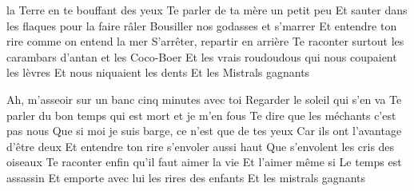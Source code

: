  la Terre en te bouffant des yeux
Te parler de ta mère un petit peu
Et sauter dans les flaques pour la faire râler
Bousiller nos godasses et s'marrer
Et entendre ton rire comme on entend la mer
S'arrêter, repartir en arrière
Te raconter surtout les carambars d'antan et les Coco-Boer
Et les vrais roudoudous qui nous coupaient les lèvres
Et nous niquaient les dents
Et les Mistrals gagnants
\endverse

\beginverse
Ah, m'asseoir sur un banc cinq minutes avec toi
Regarder le soleil qui s'en va
Te parler du bon temps qui est mort et je m'en fous
Te dire que les méchants c'est pas nous
Que si moi je suis barge, ce n'est que de tes yeux
Car ils ont l'avantage d'être deux
Et entendre ton rire s'envoler aussi haut
Que s'envolent les cris des oiseaux
Te raconter enfin qu'il faut aimer la vie
Et l'aimer même si
Le temps est assassin
Et emporte avec lui les rires des enfants
Et les mistrals gagnants
\]\]\]\]\]\]\]\]\]\]\]\]\]\]\]\]\]\]\]\]\]\]\]\]\]\]\]\]\]\]\]\]\]\]\]\]\]\]\]\]\]\]\]\]\]\]\]\]\]\]\]\]\]\]\]\]\]\]\]\]\]\]\]\]\]\]\]\]\]\]\]\]\]\]\]\]\]\]\]\]\]\]\]\]\]\]\]\]\]\]\]\]\]\]\]\]\]\]\]\]\]\]\]\]\]\]\]\]\]\]\]\]\]\]\]\]\]\]\]\]\]\]\]\]\]\]\]\]\]\]\]\]\]\]\]\]\]\]\]\]\]\]\]\]\]\]\]\]\]\]\]\]\]\]\]\]\]\]\]\]\]\]\]\]\]\]\]\]\]\]\]\]\]\]\]\]\]\]\]\]\]\]\]\]\]\]\]\]\]\]\]\]\]\]\]\]\]\]\]\]\]\]\]\]\]\]\]\]\]\]\]\]\]\]\]\]\]\]\]\]\]\]\]\]\]\]\]\]\]\]\]\]\]\]\]\]\]\]\]\]\]\]\]\]\]\]\]\]\]\]\]\]\]\]\]\]\]\]\]\]\]\]\]\]\]\]\]\]\]\]\]\]\]\]\]\]\]\]\]\]\]\]\]\]\]\]\]\]\]\]\]\]\]\]\]\]\]\]\]\]\]\]\]\]\]\]\]\]\]\]\]\]\]\]\]\]\]\]\]\]\]\]\]\]\]\]\]\]\]\]\]\]\]\]\]\]\]\]\]\]\]\]\]\]\]\]\]\]\]\]\]\]\]\]\]\]\]\]\]\]\]\]\]\]\]\]\]\]\]\]\]\]\]\]\]\]\]\]\]\]\]\]\]\]\]\]\]\]\]\]\]\]\]\]\]\]\]\]\]\]\]\]\]\]\]\]\]\]\]\]\]\]\]\]\]\]\]\]\]\]\]\]\]\]\]\]\]\]\]\]\]\]\]\]\]\]\]\]\]\]\]\]\]\]\]\]\]\]\]\]\]\]\]\]\]\]\]\]\]\]\]\]\]\]\]\]\]\]\]\]\]\]\]\]\]\]\]\]\]\]\]\]\]\]\]\]\]\]\]\]\]\]\]\]\]\]\]\]\]\]\]\]\]\]\]\]\]\]\]\]\]\]\]\]\]\]\]\]\]\]\]\]\]\]\]\]\]\]\]\]\]\]\]\]\]\]\]\]\]\]\]\]\]\]\]\]\]\]\]\]\]\]\]\]\]\]\]\]\]\]\]\]\]\]\]\]\]\]\]\]\]\]\]\]\]\]\]\]\]\]\]\]\]\]\]\]\]\]\]\]\]\]\]\]\]\]\]\]\]\]\]\]\]\]\]\]\]\]\]\]\]\]\]\]\]\]\]\]\]\]\]\]\]\]\]\]\]\]\]\]\]\]\]\]\]\]\]\]\]\]\]\]\]\]\]\]\]\]\]\]\]\]\]\]\]\]\]\]\]\]\]\]\]\]\]\]\]\]\]\]\]\]\]\]\]\]\]\]\]\]\]\]\]\]\]\]\]\]\]\]\]\]\]\]\]\]\]\]\]\]\]\]\]\]\]\]\]\]\]\]\]\]\]\]\]\]\]\]\]\]\]\]\]\]\]\]\]\]\]\]\]\]\]\]\]\]\]\]\]\]\]\]\]\]\]\]\]\]\]\]\]\]\]\]\]\]\]\]\]\]\]\]\]\]\]\]\]\]\]\]\]\]\]\]\]\]\]\]\]\]\]\]\]\]\]\]\]\]\]\]\]\]\]\]\]\]\]\]\]\]\]\]\]\]\]\]\]\]\]\]\]\]\]\]\]\]\]\]\]\]\]\]\]\]\]\]\]\]\]\]\]\]\]\]\]\]\]\]\]\]\]\]\]\]\]\]\]\]\]\]\]\]\]\]\]\]\]\]\]\]\]\]\]\]\]\]\]\]\]\]\]\]\]\]\]\]\]\]\]\]\]\]\]\]\]\]\]\]\]\]\]\]\]\]\]\]\]\]\]\]\]\]\]\]\]\]\]\]\]\]\]\]\]\]\]\]\]\]\]\]\]\]\]\]\]\]\]\]\]\]\]\]\]\]\]\]\]\]\]\]\]\]\]\]\]\]\]\]\]\]\]\]\]\]\]\]\]\]\]\]\]\]\]\]\]\]\]\]\]\]\]\]\]\]\]\]\]\]\]\]\]\]\]\]\]\]\]\]\]\]\]\]\]\]\]\]\]\]\]\]\]\]\]\]\]\]\]\]\]\]\]\]\]\]\]\]\]\]\]\]\]\]\]\]\]\]\]\]\]\]\]\]\]\]\]\]\]\]\]\]\]\]\]\]\]\]\]\]\]\]\]\]\]\]\]\]\]\]\]\]\]\]\]\]\]\]\]\]\]\]\]\]\]\]\]\]\]\]\]\]\]\]\]\]\]\]\]\]\]\]\]\]\]\]\]\]\]\]\]\]\]\]\]\]\]\]\]\]\]\]\]\]\]\]\]\]\]\]\]\]\]\]\]\]\]\]\]\]\]\]\]\]\]\]\]\]\]\]\]\]\]\]\]\]\]\]\]\]\]\]\]\]\]\]\]\]\]\]\]\]\]\]\]\]\]\]\]\]\]\]\]\]\]\]\]\]\]\]\]\]\]\]\]\]\]\]\]\]\]\]\]\]\]\]\]\]\]\]\]\]\]\]\]\]\]\]\]\]\]\]\]\]\]\]\]\]\]
